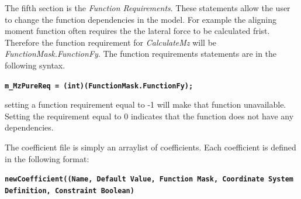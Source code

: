 The fifth section is the \textsl{\textquotedbl Function Requirements\textquotedbl}. These statements allow the user to change the function dependencies in the model. For example the aligning moment function often requires the the lateral force to be calculated frist. Therefore the function requirement for \textsl{CalculateMz} will be \textsl{FunctionMask.FunctionFy}. The function requirements statements are in the following syntax.

\textbf{\texttt{m\_MzPureReq = (int)(FunctionMask.FunctionFy);}}

setting a function requirement equal to -1 will make that function unavailable. Setting the requirement equal to 0 indicates that the function does not have any dependencies.

The coefficient file is simply an arraylist of coefficients. Each coefficient is defined in the following format:

\texttt{\textbf{newCoefficient((\textquotedbl Name\textquotedbl , Default Value, Function Mask, Coordinate System Definition, Constraint Boolean)}}

